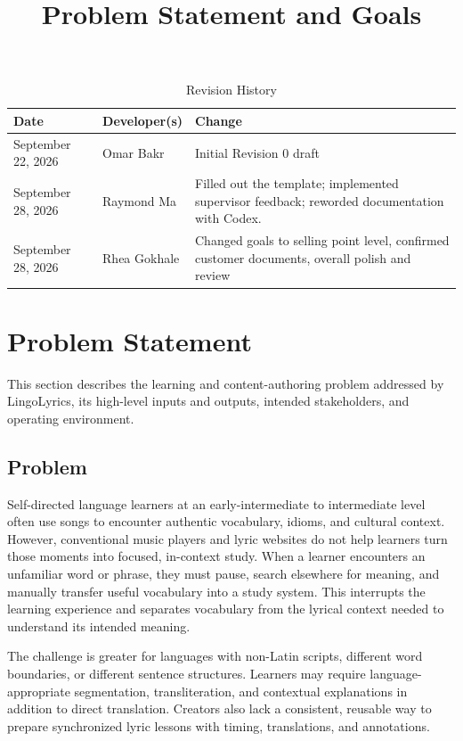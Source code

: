 \documentclass{article}
\title{Problem Statement and Goals\\\progname}
\author{\authname}
\date{}
\begin{document}
\maketitle

\begin{table}[hp]
\caption{Revision History} \label{TblRevisionHistory}
\begin{tabularx}{\textwidth}{llX}
\toprule
\textbf{Date} & \textbf{Developer(s)} & \textbf{Change}\\
\midrule
September 22, 2026 & Omar Bakr & Initial Revision 0 draft\\
September 28, 2026 & Raymond Ma & Filled out the template; implemented supervisor feedback; reworded documentation with Codex.\\
September 28, 2026 & Rhea Gokhale & Changed goals to selling point level, confirmed customer documents, overall polish and review \\
\bottomrule
\end{tabularx}
\end{table}

\section{Problem Statement}
This section describes the learning and content-authoring problem addressed by
LingoLyrics, its high-level inputs and outputs, intended stakeholders, and
operating environment.

\subsection{Problem}
Self-directed language learners at an early-intermediate to intermediate level
often use songs to encounter authentic vocabulary, idioms, and cultural
context. However, conventional music players and lyric websites do not help
learners turn those moments into focused, in-context study. When a learner
encounters an unfamiliar word or phrase, they must pause, search elsewhere for
meaning, and manually transfer useful vocabulary into a study system. This
interrupts the learning experience and separates vocabulary from the lyrical
context needed to understand its intended meaning.

The challenge is greater for languages with non-Latin scripts, different word
boundaries, or different sentence structures. Learners may require
language-appropriate segmentation, transliteration, and contextual explanations
in addition to direct translation. Creators also lack a consistent, reusable way
to prepare synchronized lyric lessons with timing, translations, and
annotations.
\end{document}
